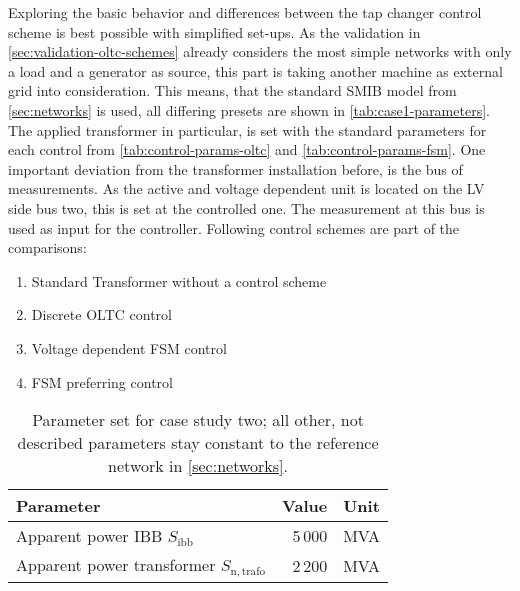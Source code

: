 Exploring the basic behavior and differences between the tap changer control scheme is best possible with simplified set-ups.
As the validation in \autoref{sec:validation-oltc-schemes} already considers the most simple networks with only a load and a generator as source, this part is taking another machine as external grid into consideration.
This means, that the standard \acs{SMIB} model from \autoref{sec:networks} is used, all differing presets are shown in \autoref{tab:case1-parameters}.
The applied transformer in particular, is set with the standard parameters for each control from \autoref{tab:control-params-oltc} and \autoref{tab:control-params-fsm}.
One important deviation from the transformer installation before, is the bus of measurements.
As the active and voltage dependent unit is located on the \acs{LV} side bus two, this is set at the controlled one.
The measurement at this bus is used as input for the controller.
Following control schemes are part of the comparisons:
\newpage
\begin{enumerate}
    \item Standard Transformer without a control scheme
    \item Discrete \acs{OLTC} control
    \item Voltage dependent \acs{FSM} control
    \item \acs{FSM} preferring control
\end{enumerate} 

\begin{table}[htbp!]
    \caption[Parameter set for case study two]{Parameter set for case study two; all other, not described parameters stay constant to the reference network in \autoref{sec:networks}.}
    \label{tab:case1-parameters}
    \vspace*{12pt}
    \centering
    \small
    \begin{tabularx}{\textwidth}{Xrl}
        \textbf{Parameter} & \textbf{Value} & \textbf{Unit} \\ \hline
        \toprule
        Apparent power \acs{IBB} $S_\mathrm{ibb}$ & 5\,000 & MVA \\
        Apparent power transformer $S_\mathrm{n,trafo}$ & 2\,200 & MVA \\
        \bottomrule
    \end{tabularx}
\end{table}

